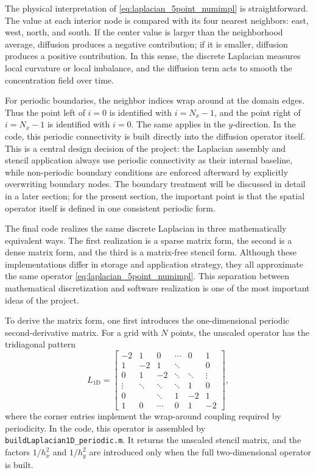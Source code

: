 The physical interpretation of \eqref{eq:laplacian_5point_numimpl} is straightforward. The value at each interior node is compared with its four nearest neighbors: east, west, north, and south. If the center value is larger than the neighborhood average, diffusion produces a negative contribution; if it is smaller, diffusion produces a positive contribution. In this sense, the discrete Laplacian measures local curvature or local imbalance, and the diffusion term acts to smooth the concentration field over time.

For periodic boundaries, the neighbor indices wrap around at the domain edges. Thus the point left of $i=0$ is identified with $i=N_x-1$, and the point right of $i=N_x-1$ is identified with $i=0$. The same applies in the $y$-direction. In the code, this periodic connectivity is built directly into the diffusion operator itself. This is a central design decision of the project: the Laplacian assembly and stencil application always use periodic connectivity as their internal baseline, while non-periodic boundary conditions are enforced afterward by explicitly overwriting boundary nodes. The boundary treatment will be discussed in detail in a later section; for the present section, the important point is that the spatial operator itself is defined in one consistent periodic form.

The final code realizes the same discrete Laplacian in three mathematically equivalent ways. The first realization is a sparse matrix form, the second is a dense matrix form, and the third is a matrix-free stencil form. Although these implementations differ in storage and application strategy, they all approximate the same operator \eqref{eq:laplacian_5point_numimpl}. This separation between mathematical discretization and software realization is one of the most important ideas of the project.

To derive the matrix form, one first introduces the one-dimensional periodic second-derivative matrix. For a grid with $N$ points, the unscaled operator has the tridiagonal pattern
\begin{equation}
L_{1\mathrm{D}} =
\begin{bmatrix}
-2 & 1  & 0  & \cdots & 0 & 1 \\
1  & -2 & 1  & \ddots &   & 0 \\
0  & 1  & -2 & \ddots & \ddots & \vdots \\
\vdots & \ddots & \ddots & \ddots & 1 & 0 \\
0  &   & \ddots & 1 & -2 & 1 \\
1  & 0 & \cdots & 0 & 1 & -2
\end{bmatrix},
\label{eq:l1d_periodic_numimpl}
\end{equation}
where the corner entries implement the wrap-around coupling required by periodicity. In the code, this operator is assembled by \texttt{buildLaplacian1D\_periodic.m}. It returns the unscaled stencil matrix, and the factors $1/h_x^2$ and $1/h_y^2$ are introduced only when the full two-dimensional operator is built.


